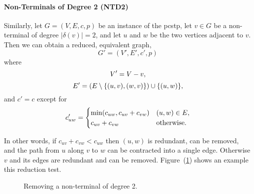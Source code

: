   \paragraph{Non-Terminals of Degree 2 (NTD2)}
    \label{fig:red:test2}
    Similarly, let $G = (V,E,c,p)$ be an instance of the \gls{pcstp}, let $v \in G$ be a non-terminal of degree $|\delta(v)| = 2$, and let
    $u$ and $w$ be the two vertices adjacent to $v$. Then we can obtain a reduced, equivalent graph,
    \[G' = (V', E', c', p)\]
    where
    \[V' = V - v \mathnormal{,}\]
    \[E' = (E \setminus \{(u,v),(w,v)\}) \cup \{(u,w)\}\mathnormal{,}\]
    and $c' = c$ except for
    $$c'_{uw} =
    \begin{cases}
      \min(c_{uw}, c_{uv} + c_{vw}) & (u,w) \in E\mathnormal{,} \\
      c_{uv} + c_{vw} & \text{otherwise.}
    \end{cases}$$

    In other words, if $c_{uv} + c_{vw} <  c_{uw}$ then $(u,w)$ is redundant, can be removed,
    and the path from $u$ along $v$ to $w$
    can be contracted into a single edge.
    Otherwise $v$ and its edges are redundant and can be removed. Figure~(\ref{fig:pre:ntd2})
    shows an example this reduction test.

\begin{figure}[h!]\centering
  \caption{Removing a non-terminal of degree 2.}  \label{fig:pre:ntd2}
\end{figure}

